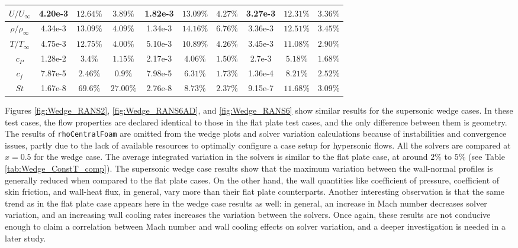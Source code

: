 \documentclass[journal ]{new-aiaa}
\begin{document}
\begin{table}
\begin{tabular}{|c|c|c|c|c|c|c|c|c|c|}
\textbf{$U/U_{\infty}$}    & 4.20e-3 & $12.64\%$ & $3.89\%$  & 1.82e-3 & $13.09\%$ & $4.27\%$ & 3.27e-3 & $12.31\%$ & $3.36\%$ \\ \hline
\textbf{$\rho/\rho_{\infty}$} & 4.34e-3 & $13.09\%$ & $4.09\%$  & 1.34e-3 & $14.16\%$ & $6.76\%$ & 3.36e-3 & $12.51\%$ & $3.45\%$ \\ \hline
\textbf{$T/T_{\infty}$}    & 4.75e-3 & $12.75\%$ & $4.00\%$  & 5.10e-3 & $10.89\%$ & $4.26\%$ & 3.45e-3 & $11.08\%$ & $2.90\%$ \\ \hline
\textbf{$c_P$}  & 1.28e-2 & $3.4\%$  & $1.15\%$  & 2.17e-3 & $4.06\%$  & $1.50\%$ & 2.7e-3  & $5.18\%$  & $1.68\%$ \\ \hline
\textbf{$c_f$}  & 7.87e-5 & $2.46\%$  & $0.9\%$  & 7.98e-5 & $6.31\%$  & $1.73\%$ & 1.36e-4 & $8.21\%$  & $2.52\%$ \\ \hline
\textbf{$St$}   & 1.67e-8 & $69.6\%$  & $27.00\%$ & 2.76e-8 & $8.73\%$  & $2.37\%$ & 9.15e-7 & $11.68\%$ & $3.09\%$ \\ \hline
\end{tabular}
\end{table}



Figures \ref{fig:Wedge_RANS2}, \ref{fig:Wedge_RANS6AD}, and \ref{fig:Wedge_RANS6} show similar results for the supersonic wedge cases. In these test cases, the flow properties are declared identical to those in the flat plate test cases, and the only difference between them is geometry. The results of \texttt{rhoCentralFoam} are omitted from the wedge plots and solver variation calculations because of instabilities and convergence issues, partly due to the lack of available resources to optimally configure a case setup for hypersonic flows. All the solvers are compared at $x=0.5$ for the wedge case. The average integrated variation in the solvers is similar to the flat plate case, at around $2\%$ to $5\%$ (see Table \ref{tab:Wedge_ConstT_comp}). The supersonic wedge case results show that the maximum variation between the wall-normal profiles is generally reduced when compared to the flat plate cases. On the other hand, the wall quantities like coefficient of pressure, coefficient of skin friction, and wall-heat flux, in general, vary more than their flat plate counterparts. Another interesting observation is that the same trend as in the flat plate case appears here in the wedge case results as well: in general, an increase in Mach number decreases solver variation, and an increasing wall cooling rates increases the variation between the solvers. Once again, these results are not conducive enough to claim a correlation between Mach number and wall cooling effects on solver variation, and a deeper investigation is needed in a later study. 
\end{document}
